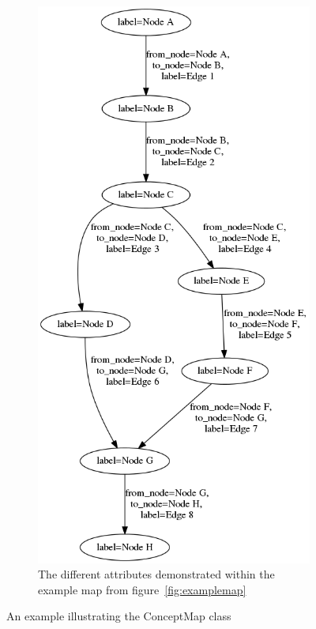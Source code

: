 \begin{figure}
\begin{subfigure}{0.4\textwidth}
        \includegraphics[height=.6\textheight]{img/examplemap_objects.png}
        \caption{The different attributes demonstrated within the example map from figure~\protect\ref{fig:examplemap}}
        \label{fig:examplemap_objects}
    \end{subfigure}
    \caption{An example illustrating the ConceptMap class}
    \label{fig:examplemaps}
\end{figure}

